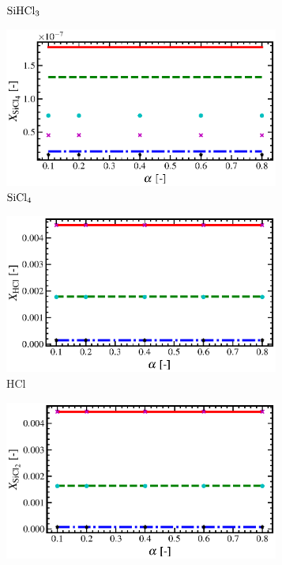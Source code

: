 \documentclass[final, letterpaper, square, comma, numbers, sort&compress]{elsarticle}
\begin{document}
\begin{figure}
\begin{subfigure}{0.49\textwidth}
        \caption{$\rm SiHCl_3$}
    \end{subfigure}
    \begin{subfigure}{0.49\textwidth}
        \centering
        \includegraphics[width=0.99\textwidth]{dP-vs-SiCl4-P-5-compare}
        \caption{$\rm SiCl_4$}
    \end{subfigure}
    \begin{subfigure}{0.49\textwidth}
        \centering
        \includegraphics[width=0.99\textwidth]{dP-vs-HCl-P-5-compare}
        \caption{HCl}
    \end{subfigure}
    \begin{subfigure}{0.49\textwidth}
        \centering
        \includegraphics[width=0.99\textwidth]{dP-vs-SiCl2-P-5-compare}

\end{subfigure}
\end{figure}
\end{document}
